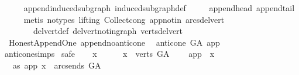 \begin{isabellebody}
\ \ \ \ \isamarkupfalse%
\ append{\isacharunderscore}{\kern0pt}induced{\isacharunderscore}{\kern0pt}subgraph\ induced{\isacharunderscore}{\kern0pt}subgraph{\isacharunderscore}{\kern0pt}def\ \isanewline
\ \ \ \ append{\isacharunderscore}{\kern0pt}head\ append{\isacharunderscore}{\kern0pt}tail\isanewline
\ \ \ \ \isamarkupfalse%
\ {\isacharparenleft}{\kern0pt}metis\ {\isacharparenleft}{\kern0pt}no{\isacharunderscore}{\kern0pt}types{\isacharcomma}{\kern0pt}\ lifting{\isacharparenright}{\kern0pt}\ Collect{\isacharunderscore}{\kern0pt}cong\ app{\isacharunderscore}{\kern0pt}notin\ arcs{\isacharunderscore}{\kern0pt}del{\isacharunderscore}{\kern0pt}vert\isanewline
\ \ \ \ \ \ \ \ del{\isacharunderscore}{\kern0pt}vert{\isacharunderscore}{\kern0pt}def\ del{\isacharunderscore}{\kern0pt}vert{\isacharunderscore}{\kern0pt}not{\isacharunderscore}{\kern0pt}in{\isacharunderscore}{\kern0pt}graph\ verts{\isacharunderscore}{\kern0pt}del{\isacharunderscore}{\kern0pt}vert{\isacharparenright}{\kern0pt}\ \isanewline
{}\isamarkupfalse%
%
\endisatagproof
{\isafoldproof}%
%
\isadelimproof
\isanewline
%
\endisadelimproof
\isanewline
{}\isamarkupfalse%
\ {\isacharparenleft}{\kern0pt}\ Honest{\isacharunderscore}{\kern0pt}Append{\isacharunderscore}{\kern0pt}One{\isacharparenright}{\kern0pt}\ append{\isacharunderscore}{\kern0pt}no{\isacharunderscore}{\kern0pt}anticone{\isacharcolon}{\kern0pt}\isanewline
\ \ {\isachardoublequoteopen}anticone\ G{\isacharunderscore}{\kern0pt}A\ app\ {\isacharequal}{\kern0pt}\ {\isacharbraceleft}{\kern0pt}{\isacharbraceright}{\kern0pt}{\isachardoublequoteclose}\isanewline
%
\isadelimproof
\ \ %
\endisadelimproof
%
\isatagproof
{}\isamarkupfalse%
\ anticone{\isachardot}{\kern0pt}simps\isanewline
{}\isamarkupfalse%
\ safe\isanewline
\ \ \isamarkupfalse%
\ x\ \isanewline
\ \ \isamarkupfalse%
\ \ {\isachardoublequoteopen}x\ {\isasymin}\ verts\ G{\isacharunderscore}{\kern0pt}A{\isachardoublequoteclose}\isanewline
\ \ \ \ {\isachardoublequoteopen}app\ {\isasymnoteq}\ x{\isachardoublequoteclose}\isanewline
\ \ \ as{\isacharcolon}{\kern0pt}\ {\isachardoublequoteopen}{\isacharparenleft}{\kern0pt}app{\isacharcomma}{\kern0pt}\ x{\isacharparenright}{\kern0pt}\ {\isasymnotin}\ {\isacharparenleft}{\kern0pt}arcs{\isacharunderscore}{\kern0pt}ends\ G{\isacharunderscore}{\kern0pt}A{\isacharparenright}{\kern0pt}\isactrlsup {\isacharplus}{\kern0pt}\ {\isachardoublequoteclose}\isanewline
\ \ \isamarkupfalse%

\end{isabellebody}
